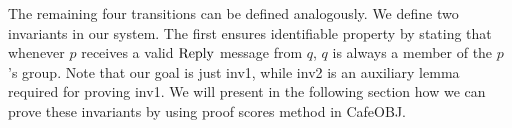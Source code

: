 \documentclass[a4paper,fleqn]{cas-dc}
\begin{document}
\noindent
The remaining four transitions
can be defined analogously.
We define two invariants in our system. The first ensures identifiable property by stating that whenever $p$ receives a valid $\rm Reply$ message from $q$, $q$ is always a member of the $p$'s group. Note that our goal is just inv1, while inv2 is an auxiliary lemma required for proving inv1.
We will present in the following section how we can prove these invariants by using proof scores method in CafeOBJ.
\end{document}
